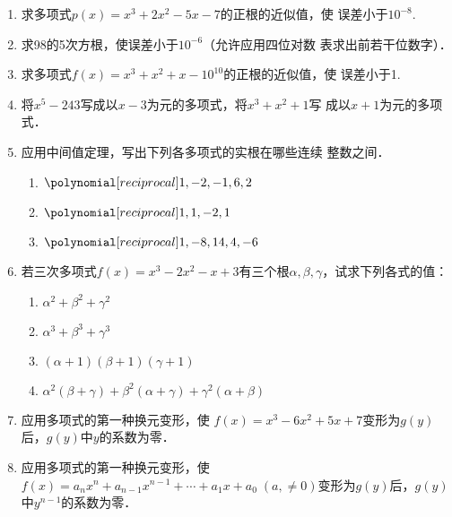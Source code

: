 \begin{enumerate}
\item 求多项式$p(x)=x^3+2x^2-5x-7$的正根的近似值，使
误差小于$10^{-8}$.

\item 求98的5次方根，使误差小于$10^{-6}$（允许应用四位对数
表求出前若干位数字）．

\item 求多项式$f(x)=x^3+x^2+x-10^{10}$的正根的近似值，使
误差小于1.

\item 将$x^5-243$写成以$x-3$为元的多项式，将$x^3+x^2+1$写
成以$x+1$为元的多项式．

\item 应用中间值定理，写出下列各多项式的实根在哪些连续
整数之间．
\begin{enumerate}
    \item $\poly{1,-2,-1,6,2}$
    \item $\poly{1,1,-2,1}$
    \item $\poly{1,-8,14,4,-6}$
\end{enumerate}

\item 若三次多项式$f(x)=x^3-2x^2-x+3$有三个根$\alpha,\beta,\gamma$，试求下列各式的值：
\begin{enumerate}
    \item $\alpha^2+\beta^2+\gamma^2$
    \item $\alpha^3+\beta^3+\gamma^3$
    \item $(\alpha+1)(\beta+1)(\gamma+1)$
    \item $\alpha^2(\beta+\gamma)+\beta^2(\alpha+\gamma)+\gamma^2(\alpha+\beta)$
\end{enumerate}


\item 应用多项式的第一种换元变形，使
$f (x) =x^3-6x^2+5x+7$变形为$g(y)$后，$g(y)$中$y$的系数为零．
\item 应用多项式的第一种换元变形，使
$f (x) =a_nx^n+a_{n-1}x^{n-1}+\cdots +a_1x+a_0\;  (a, \ne 0)$变形为$g(y)$后，$g(y)$中$y^{n-1}$的系数为零．


\end{enumerate}
